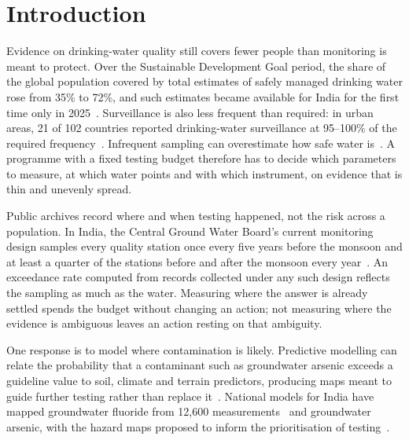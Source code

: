 \documentclass[10pt,letterpaper]{article}
\begin{document}

\FloatBarrier

\section*{Introduction}

Evidence on drinking-water quality still covers fewer people than monitoring is meant to protect. Over the Sustainable Development Goal period, the share of the global population covered by total estimates of safely managed drinking water rose from 35\% to 72\%, and such estimates became available for India for the first time only in 2025~\cite{JMP2025}. Surveillance is also less frequent than required: in urban areas, 21 of 102 countries reported drinking-water surveillance at 95--100\% of the required frequency~\cite{GLAAS2025}. Infrequent sampling can overestimate how safe water is~\cite{Bain2014}. A programme with a fixed testing budget therefore has to decide which parameters to measure, at which water points and with which instrument, on evidence that is thin and unevenly spread.

Public archives record where and when testing happened, not the risk across a population. In India, the Central Ground Water Board's current monitoring design samples every quality station once every five years before the monsoon and at least a quarter of the stations before and after the monsoon every year~\cite{CGWB-SOP-GWQDataAnalysis}. An exceedance rate computed from records collected under any such design reflects the sampling as much as the water. Measuring where the answer is already settled spends the budget without changing an action; not measuring where the evidence is ambiguous leaves an action resting on that ambiguity.

One response is to model where contamination is likely. Predictive modelling can relate the probability that a contaminant such as groundwater arsenic exceeds a guideline value to soil, climate and terrain predictors, producing maps meant to guide further testing rather than replace it~\cite{Podgorski2020}. National models for India have mapped groundwater fluoride from 12,600 measurements~\cite{Podgorski2018} and groundwater arsenic, with the hazard maps proposed to inform the prioritisation of testing~\cite{Podgorski2020-IJERPH-India}.
\end{document}
